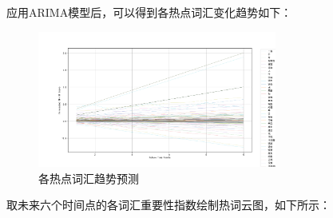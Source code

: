 \documentclass[UTF8,a4paper,15pt,titlepage,oneside]{ctexbook}
\begin{document}
应用ARIMA模型后，可以得到各热点词汇变化趋势如下：

\begin{figure}[H]
  \centering
  \includegraphics[width=0.7\textwidth,keepaspectratio=false]{pictures/13.png} %
  \caption{各热点词汇趋势预测}
\end{figure}

取未来六个时间点的各词汇重要性指数绘制热词云图，如下所示：
\end{document}
